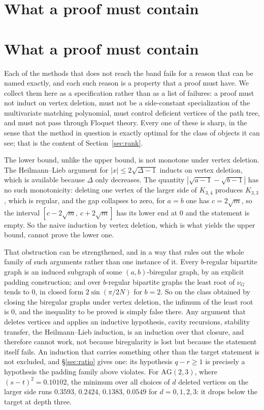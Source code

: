 \documentclass[11pt]{article}
\theoremstyle{remark}
\begin{document}
\section{What a proof must contain}

\section{What a proof must contain}\label{sec:must}

Each of the methods that does not reach the band fails for a reason that can be
named exactly, and each such reason is a property that a proof must have. We
collect them here as a specification rather than as a list of failures: a proof
must not induct on vertex deletion, must not be a side-constant specialization of
the multivariate matching polynomial, must control deficient vertices of the path
tree, and must not pass through Floquet theory. Every one of these is sharp, in
the sense that the method in question is exactly optimal for the class of objects
it can see; that is the content of Section~\ref{sec:rank}.

The lower bound, unlike the upper bound, is not monotone
under vertex deletion. The Heilmann--Lieb argument for $|x|\le2\sqrt{\Delta-1}$
inducts on vertex deletion, which is available because $\Delta$ only decreases.
The quantity $|\sqrt{a-1}-\sqrt{b-1}|$ has no such monotonicity: deleting one
vertex of the larger side of $K_{3,4}$ produces $K_{3,3}$, which is regular, and
the gap collapses to zero, for $a=b$ one has $c=2\sqrt m$, so the interval
$[c-2\sqrt m,\,c+2\sqrt m]$ has its lower end at $0$ and the statement is empty. So the naive induction by vertex deletion, which is
what yields the upper bound, cannot prove the lower one.

That obstruction can be strengthened, and in a way that rules out the whole
family of such arguments rather than one instance of it. Every $b$-regular
bipartite graph is an induced subgraph of some $(a,b)$-biregular graph, by an
explicit padding construction; and over $b$-regular bipartite graphs the least
root of $\nu_G$ tends to $0$, in closed form $2\sin(\pi/2N)$ for $b=2$. So on the
class obtained by closing the biregular graphs under vertex deletion, the
infimum of the least root is $0$, and the inequality to be proved is simply
false there. Any argument that deletes vertices and applies an inductive
hypothesis, cavity recursions, stability transfer, the Heilmann--Lieb
induction, is an induction over that closure, and therefore cannot work,
not because biregularity is lost but because the statement itself fails. An induction that
carries something other than the target statement is not excluded, and \S\ref{sec:ratio} gives
one: its hypothesis $q-r\ge1$ is precisely a hypothesis the padding family above violates. For
$\mathrm{AG}(2,3)$, where $(s-t)^2=0.10102$, the minimum over all choices of $d$
deleted vertices on the larger side runs $0.3593$, $0.2424$, $0.1383$, $0.0549$
for $d=0,1,2,3$: it drops below the target at depth three.
\end{document}
